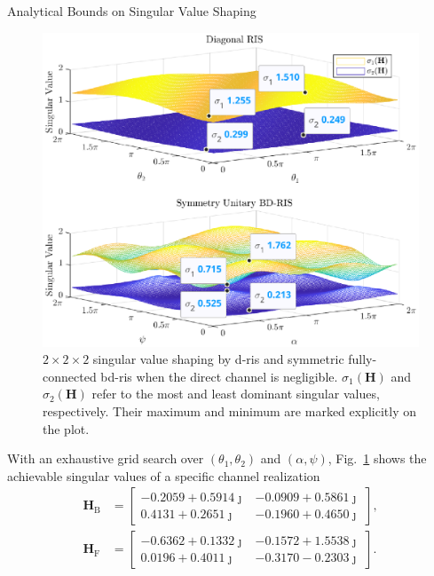 \begin{section}{Analytical Bounds on Singular Value Shaping}
\begin{example}
\begin{figure}
			\includegraphics[width=\columnwidth]{../assets/simulation/singular_trend.eps}
			\caption{$2 \times 2 \times 2$ singular value shaping by \gls{d}-\gls{ris} and symmetric fully-connected \gls{bd}-\gls{ris} when the direct channel is negligible. $\sigma_1(\mathbf{H})$ and $\sigma_2(\mathbf{H})$ refer to the most and least dominant singular values, respectively.
				Their maximum and minimum are marked explicitly on the plot.}
			\label{fg:singular_trend}
		\end{figure}
		With an exhaustive grid search over $(\theta_1, \theta_2)$ and $(\alpha, \psi)$, Fig.~\ref{fg:singular_trend} shows the achievable singular values of a specific channel realization
		\begin{equation*}
			\begin{split}
				\mathbf{H}_\mathrm{B} & =
				\begin{bmatrix}
					-0.2059 + 0.5914 \jmath & -0.0909 + 0.5861 \jmath \\
					0.4131 + 0.2651 \jmath  & -0.1960 + 0.4650 \jmath
				\end{bmatrix},
				\\
				\mathbf{H}_\mathrm{F} & =
				\begin{bmatrix}
					-0.6362 + 0.1332 \jmath & -0.1572 + 1.5538 \jmath \\
					0.0196 + 0.4011 \jmath  & -0.3170 - 0.2303 \jmath
				\end{bmatrix}.
			\end{split}
		\end{equation*}

\end{example}
\end{section}
